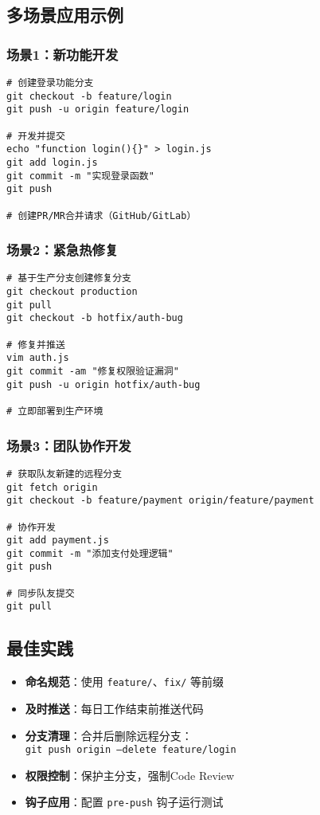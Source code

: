 \subsection{多场景应用示例}
\subsubsection{场景1：新功能开发}
\begin{verbatim}
# 创建登录功能分支
git checkout -b feature/login
git push -u origin feature/login

# 开发并提交
echo "function login(){}" > login.js
git add login.js
git commit -m "实现登录函数"
git push

# 创建PR/MR合并请求（GitHub/GitLab）
\end{verbatim}

\subsubsection{场景2：紧急热修复}
\begin{verbatim}
# 基于生产分支创建修复分支
git checkout production
git pull
git checkout -b hotfix/auth-bug

# 修复并推送
vim auth.js
git commit -am "修复权限验证漏洞"
git push -u origin hotfix/auth-bug

# 立即部署到生产环境
\end{verbatim}

\subsubsection{场景3：团队协作开发}
\begin{verbatim}
# 获取队友新建的远程分支
git fetch origin
git checkout -b feature/payment origin/feature/payment

# 协作开发
git add payment.js
git commit -m "添加支付处理逻辑"
git push

# 同步队友提交
git pull
\end{verbatim}

\subsection{最佳实践}
\begin{itemize}[leftmargin=*, nosep]
    \item \textbf{命名规范}：使用 \texttt{feature/}、\texttt{fix/} 等前缀
    \item \textbf{及时推送}：每日工作结束前推送代码
    \item \textbf{分支清理}：合并后删除远程分支：\\
    \texttt{git push origin --delete feature/login}
    \item \textbf{权限控制}：保护主分支，强制Code Review
    \item \textbf{钩子应用}：配置 \texttt{pre-push} 钩子运行测试
\end{itemize}


